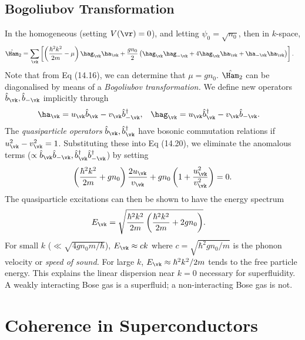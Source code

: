 \documentclass[a4paper, 11pt, normalem]{report}
\begin{document}
\section{Bogoliubov Transformation}
In the homogeneous (setting $V(\vr)=0$), and letting $\psi_0=\sqrt{n_0}$, then in $k$-space,
\begin{align}
    \hat{\Ham}_2 &= \sum_{\vk}\left[\left(\frac{\hbar^2k^2}{2m}-\mu\right)\hag_{\vk}\ha_{\vk} + \frac{gn_0}{2}\left(\hag_{\vk}\hag_{-\vk} + 4\hag_{\vk}\ha_{\vk} + \ha_{-\vk}\ha_{\vk}\right)\right].
\end{align}
Note that from Eq (14.16), we can determine that $\mu=gn_0$.
$\hat{\Ham}_2$ can be diagonalised by means of a \emph{Bogoliubov transformation.}
We define new operators $\hat{b}_{\vk},\hat{b}_{-\vk}$ implicitly through
\begin{align}
    \ha_{\vk} &= u_{\vk}\hat{b}_{\vk} - v_{\vk}\hat{b}^\dagger_{-\vk}, & \hag_{\vk} &= u_{\vk}\hat{b}^\dagger_{\vk} - v_{\vk}\hat{b}_{-\vk}.
\end{align}
The \emph{quasiparticle operators} $\hat{b}_{\vk},\hat{b}^\dagger_{\vk}$ have bosonic commutation relations if $u_{\vk}^2-v_{\vk}^2=1$.
Substituting these into Eq (14.20), we eliminate the anomalous terms ($\propto \hat{b}_{\vk}\hat{b}_{-\vk},\hat{b}^\dagger_{\vk}\hat{b}^\dagger_{-\vk}$) by setting
\begin{align}
    \left(\frac{\hbar^2k^2}{2m}+gn_0\right) \frac{2u_{\vk}}{v_{\vk}} + gn_0\left(1+\frac{u_{\vk}^2}{v_{\vk}^2}\right) = 0.
\end{align}
The quasiparticle excitations can then be shown to have the energy spectrum
\begin{align}
    E_{\vk} &= \sqrt{\frac{\hbar^2k^2}{2m}\left(\frac{\hbar^2k^2}{2m}+2gn_0\right)}.
\end{align}
For small $k$ ($\ll\sqrt{4gn_0m/\hbar}$), $E_{\vk}\approx ck$ where $c=\sqrt{\hbar^2gn_0/m}$ is the phonon velocity or \emph{speed of sound.}
For large $k$, $E_{\vk}\approx \hbar^2k^2/2m$ tends to the free particle energy.
This explains the linear dispersion near $k=0$ necessary for superfluidity.
A weakly interacting Bose gas is a superfluid; a non-interacting Bose gas is not.

\chapter{Coherence in Superconductors}
\end{document}
